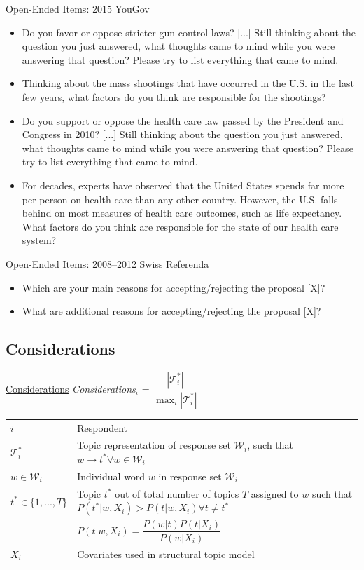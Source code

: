 \begin{frame}{Open-Ended Items: 2015 YouGov}
\begin{itemize}
\item Do you favor or oppose stricter gun control laws? [...] Still thinking about the question you just answered, what thoughts came to mind while you were answering that question? Please try to list everything that came to mind.
\item Thinking about the mass shootings that have occurred in the U.S. in the last few years, what factors do you think are responsible for the shootings?
\item Do you support or oppose the health care law passed by the President and Congress in 2010?
[...] Still thinking about the question you just answered, what thoughts came to mind while you were answering that question? Please try to list everything that came to mind.
\item For decades, experts have observed that the United States spends far more per person on health care than any other country. However, the U.S. falls behind on most measures of health care outcomes, such as life expectancy. What factors do you think are responsible for the state of our health care system?
\end{itemize}
\end{frame}

\begin{frame}{Open-Ended Items: 2008--2012 Swiss Referenda}
\begin{itemize}
\item Which are your main reasons for accepting/rejecting the proposal [X]?
\item What are additional reasons for accepting/rejecting the proposal [X]?
\end{itemize}
\end{frame}

\subsection{Considerations}
\begin{frame}{\hyperlink{components}{Considerations}}\label{elaboration}\centering
\emph{Considerations}$_i$ = $\dfrac{|\mathcal{T}^*_i|}{\max_i|\mathcal{T}^*_i|}$
\vspace{1em}\\
\begin{tabular}{lp{8.5cm}}
\toprule
$i$ & Respondent \\
$\mathcal{T}^*_i $ & Topic representation of response set $\mathcal{W}_i$, such that $w\rightarrow t^*\forall w \in \mathcal{W}_i$ \\
$w \in \mathcal{W}_i$ & Individual word $w$ in response set $\mathcal{W}_i$\\

$t^* \in \{1,...,T\} $ & Topic $t^*$ out of total number of topics $T$ assigned to $w$ such that $P(t^*|w,X_i) > P(t|w,X_i) \forall t\neq t^*$\\
& $P(t|w,X_i)=\dfrac{P(w|t)P(t|X_i)}{P(w|X_i)}$ \\
$X_i$ & Covariates used in structural topic model
\end{tabular}
\end{frame}

